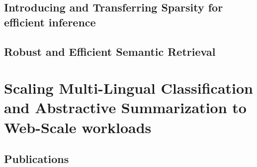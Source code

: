 \section{Introducing and Transferring Sparsity for efficient inference}
\label{app:sparsity}
\section{Robust and Efficient Semantic Retrieval}
\label{app:retrieval}

\chapter{Scaling Multi-Lingual Classification and Abstractive Summarization to Web-Scale workloads}
\label{app:scaling-workload}

\section{Publications}
